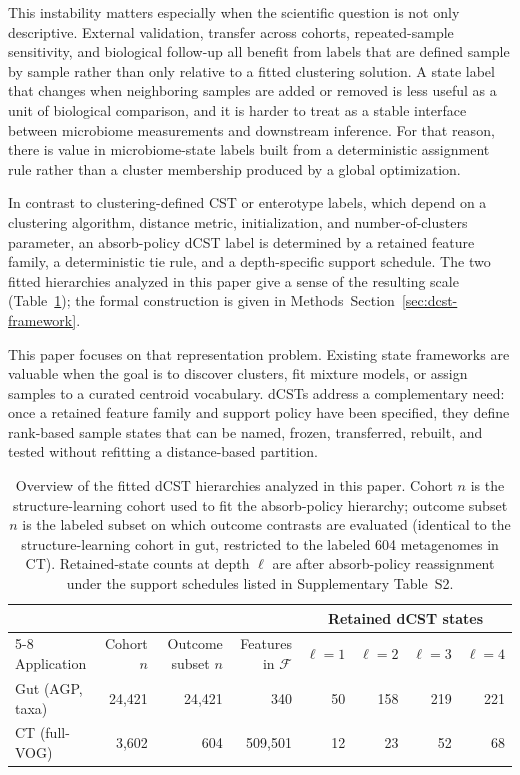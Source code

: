 \documentclass[11pt]{article}
\newcounter{algorithm}
\begin{document}
This instability matters especially when the scientific question is not only
descriptive. External validation, transfer across cohorts, repeated-sample
sensitivity, and biological follow-up all benefit from labels that are defined
sample by sample rather than only relative to a fitted clustering solution. A
state label that changes when neighboring samples are added or removed is less
useful as a unit of biological comparison, and it is harder to treat as a
stable interface between microbiome measurements and downstream inference. For
that reason, there is value in microbiome-state labels built from a
deterministic assignment rule rather than a cluster membership produced by a
global optimization.

In contrast to clustering-defined CST or enterotype labels, which depend on a
clustering algorithm, distance metric, initialization, and number-of-clusters
parameter, an absorb-policy dCST label is determined by a retained feature
family, a deterministic tie rule, and a depth-specific support schedule. The
two fitted hierarchies analyzed in this paper give a sense of the resulting
scale (Table~\ref{tab:fitted-hierarchies}); the formal construction is given in
Methods~Section~\ref{sec:dcst-framework}.

This paper focuses on that representation problem. Existing state frameworks
are valuable when the goal is to discover clusters, fit mixture models, or
assign samples to a curated centroid vocabulary. dCSTs address a complementary
need: once a retained feature family and support policy have been specified,
they define rank-based sample states that can be named, frozen, transferred,
rebuilt, and tested without refitting a distance-based partition.

\begin{table}[!t]
\centering
\footnotesize
\setlength{\tabcolsep}{5pt}
\renewcommand{\arraystretch}{1.15}
\begin{tabular}{@{} l r r r r r r r @{}}
\toprule
 & & & & \multicolumn{4}{c}{Retained dCST states} \\
\cmidrule(lr){5-8}
Application & Cohort $n$ & Outcome subset $n$ & Features in $\mathcal{F}$ & $\ell{=}1$ & $\ell{=}2$ & $\ell{=}3$ & $\ell{=}4$ \\
\midrule
Gut (AGP, taxa) & 24,421 & 24,421 & 340 & 50 & 158 & 219 & 221 \\
CT (full-VOG)   & 3,602  & 604    & 509,501 & 12 & 23 & 52 & 68 \\
\bottomrule
\end{tabular}
\caption{Overview of the fitted dCST hierarchies analyzed in this paper. Cohort $n$ is the
structure-learning cohort used to fit the absorb-policy hierarchy; outcome
subset $n$ is the labeled subset on which outcome contrasts are evaluated
(identical to the structure-learning cohort in gut, restricted to the labeled
604 metagenomes in CT). Retained-state counts at depth $\ell$ are after
absorb-policy reassignment under the support schedules listed in
Supplementary Table~S2.}
\label{tab:fitted-hierarchies}
\end{table}
\end{document}
